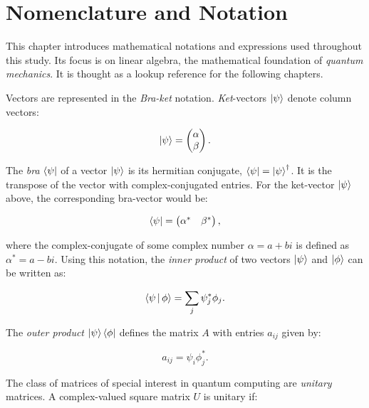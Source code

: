 \chapter{Nomenclature and Notation}
\label{sec:notation}

This chapter introduces mathematical notations and expressions used throughout 
this study. Its focus is on linear algebra, the mathematical foundation of 
\textit{quantum mechanics}. It is thought as a lookup reference for the following chapters.

Vectors are represented in the \textit{Bra-ket} notation. \textit{Ket}-vectors $\Ket{\psi}$ denote 
column vectors:

\begin{equation}
   \Ket{\psi} = \begin{pmatrix} \alpha \\ \beta \end{pmatrix}.
\end{equation}

The \textit{bra} $\Bra{\psi}$ of a vector $\Ket{\psi}$ is its hermitian conjugate, 
$\Bra{\psi} = \Ket{\psi}^{\dagger}$. It is the transpose of the vector with complex-conjugated 
entries. For the ket-vector $\Ket{\psi}$ above, the corresponding bra-vector would be:

\begin{equation}
   \Bra{\psi} = \begin{pmatrix}
      \alpha^* & \beta^*
   \end{pmatrix},
\end{equation}

where the complex-conjugate of some complex number $\alpha = a + b i$ is 
defined as $\alpha^* = a - b i$. Using this notation, the \textit{inner product} of two vectors
$\Ket{\psi}$ and $\Ket{\phi}$ can be written as:

\begin{equation}
   \Braket{\psi | \phi} = \sum_j \psi_j^* \phi_j.
\end{equation}

The \textit{outer product} $\Ket{\psi} \Bra{\phi}$ defines the matrix $A$ with entries 
$a_{ij}$ given by:

\begin{equation}
   a_{ij} = \psi_i \phi^*_j.
\end{equation}

The class of matrices of special interest in quantum computing are \textit{unitary} matrices.
A complex-valued square matrix $U$ is unitary if:

